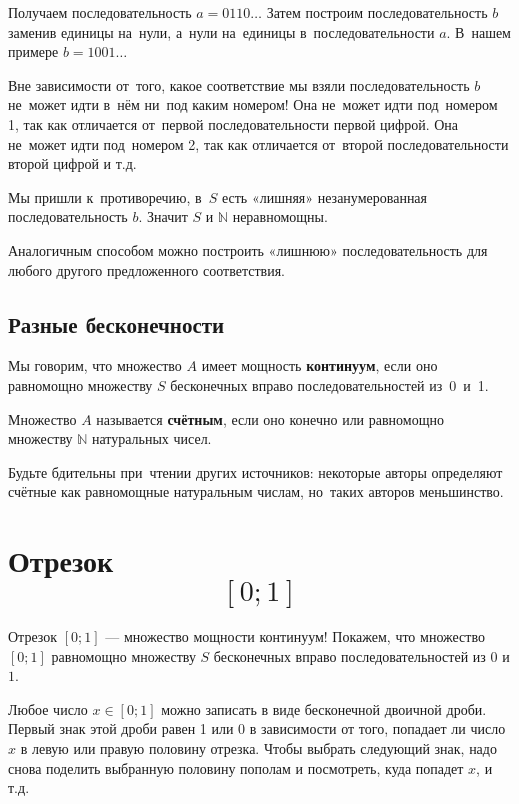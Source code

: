 \documentclass[12pt,a4paper]{article}
\begin{document}
Получаем последовательность $a=0110\ldots$ Затем построим последовательность $b$ заменив единицы на~нули, а~нули на~единицы в~последовательности $a$. В~нашем примере $b=1001\ldots $

Вне зависимости от~того, какое соответствие мы взяли  последовательность $b$ не~может идти в~нём ни~под каким номером! Она не~может идти под~номером 1, так как отличается от~первой последовательности первой цифрой. Она не~может идти под~номером 2, так как отличается от~второй последовательности второй цифрой и т.д.

Мы пришли к~противоречию, в~$S$ есть «лишняя» незанумерованная последовательность $b$. Значит $S$ и $\mathds{N}$ неравномощны.

Аналогичным способом можно построить «лишнюю» последовательность для любого другого предложенного соответствия.

\subsection{Разные бесконечности}

Мы говорим, что множество $A$ имеет мощность \textbf{континуум}, если оно равномощно множеству $S$ бесконечных вправо последовательностей из~0~и~1.


Множество $A$ называется \textbf{счётным}, если оно конечно или равномощно множеству $\mathds{N}$ натуральных чисел.

Будьте бдительны при~чтении других источников: некоторые авторы определяют счётные как равномощные натуральным числам, но~таких авторов меньшинство.

\section{Отрезок \[ [0;1] \]}

Отрезок $[0;1]$ --- множество мощности континуум!
Покажем, что множество $[0;1]$ равномощно множеству $S$ бесконечных вправо последовательностей из $0$ и $1$.

Любое число $x \in [0;1]$ можно записать в виде бесконечной двоичной дроби. Первый знак этой дроби равен 1 или 0 в зависимости от того, попадает ли число $x$ в левую или правую половину отрезка. Чтобы выбрать следующий знак, надо снова поделить выбранную половину пополам и посмотреть, куда попадет $x$, и т.д.
\end{document}
